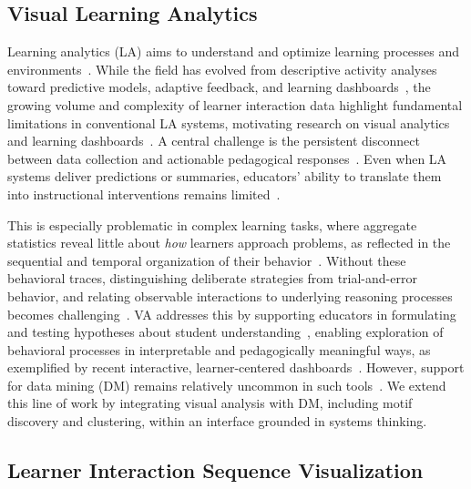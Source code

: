 \documentclass[letterpaper,journal]{IEEEtran}
\begin{document}
\subsection{Visual Learning Analytics}

Learning analytics (LA) aims to understand and optimize learning processes and environments~\cite{siemens2013learning, selwyn2020reimagining}.
While the field has evolved from descriptive activity analyses toward predictive models, adaptive feedback, and learning dashboards~\cite{matcha2019analytics, schwendimann2017perceiving, masiello2024current, paulsen2024learning}, the growing volume and complexity of learner interaction data highlight fundamental limitations in conventional LA systems, motivating research on visual analytics and learning dashboards~\cite{chatti2012reference, vieira2018visual, clow2013overview}.
A central challenge is the persistent disconnect between data collection and actionable pedagogical responses~\cite{clow2012learning}. Even when LA systems deliver predictions or summaries, educators' ability to translate them into instructional interventions remains limited~\cite{gasevi2015lets, jivet2018license}.

This is especially problematic in complex learning tasks, where aggregate statistics reveal little about \textit{how} learners approach problems, as reflected in the sequential and temporal organization of their behavior~\cite{vieira2018visual, verbert2013learning}. 
Without these behavioral traces, distinguishing deliberate strategies from trial-and-error behavior, and relating observable interactions to underlying reasoning processes becomes challenging~\cite{roll2015understanding}.
VA addresses this by supporting educators in formulating and testing hypotheses about student understanding~\cite{keim2008visual}, enabling exploration of behavioral processes in interpretable and pedagogically meaningful ways, as exemplified by recent interactive, learner-centered dashboards~\cite{gomez2021applying, khosravi2021intelligent, mohseni2024visual}.
However, support for data mining (DM) remains relatively uncommon in such tools~\cite{mohseni2024visual}. 
We extend this line of work by integrating visual analysis with DM, including motif discovery and clustering, within an interface grounded in systems thinking.



\subsection{Learner Interaction Sequence Visualization}
\end{document}
